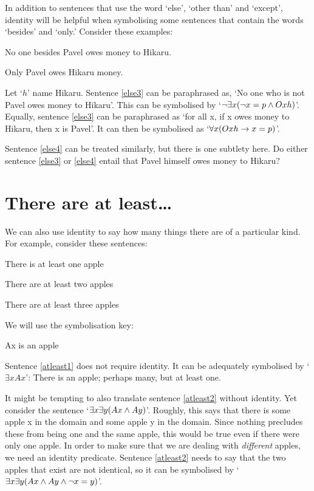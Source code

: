 In addition to sentences that use the word `else', `other than' and `except', identity will be helpful when symbolising some sentences that contain the words `besides' and `only.' Consider these examples:

\begin{earg}
\item[\ex{else3}] No one besides Pavel owes money to Hikaru.
\item[\ex{else4}] Only Pavel owes Hikaru money.
\end{earg}
Let `$h$' name Hikaru. Sentence \ref{else3} can be paraphrased as, `No one who is not Pavel owes money to Hikaru'. This can be symbolised by `$\neg\exists x(\neg x = p \wedge Oxh)$'. Equally, sentence \ref{else3} can be paraphrased as `for all x, if x owes money to Hikaru, then x is Pavel'. It can then be symbolised as `$\forall x (Oxh \rightarrow x = p)$'.

Sentence \ref{else4} can be treated similarly, but there is one subtlety here. Do either sentence \ref{else3} or \ref{else4} entail that Pavel himself owes money to Hikaru? 

\section{There are at least\ldots}
We can also use identity to say how many things there are of a particular kind. For example, consider these sentences:
\begin{earg}
\item[\ex{atleast1}] There is at least one apple
\item[\ex{atleast2}] There are at least two apples
\item[\ex{atleast3}] There are at least three apples
\end{earg}
We will use the symbolisation key:
	\begin{ekey}
		\item[Ax]  is an apple
	\end{ekey}
Sentence \ref{atleast1} does not require identity. It can be adequately symbolised by `$\exists x Ax$': There is an apple; perhaps many, but at least one.

It might be tempting to also translate sentence \ref{atleast2} without identity. Yet consider the sentence `$\exists x \exists y(Ax \wedge Ay)$'. Roughly, this says that there is some apple x in the domain and some apple y in the domain. Since nothing precludes these from being one and the same apple, this would be true even if there were only one apple. In order to make sure that we are dealing with \emph{different} apples, we need an identity predicate. Sentence \ref{atleast2} needs to say that the two apples that exist are not identical, so it can be symbolised by `$\exists x \exists y(Ax \wedge Ay \wedge \neg x = y)$'.

